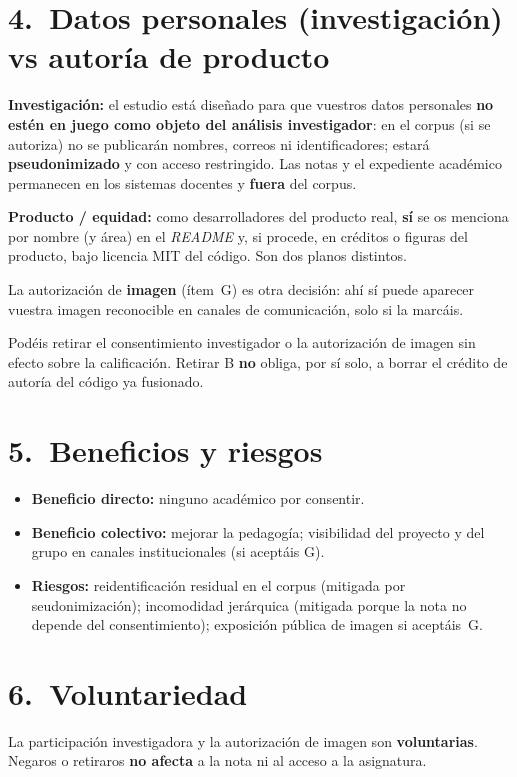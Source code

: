 \documentclass[11pt,a4paper]{scrartcl}
\begin{document}
\section*{4.\ Datos personales (investigación) vs autoría de producto}

\textbf{Investigación:} el estudio está diseñado para que vuestros datos personales
\textbf{no estén en juego como objeto del análisis investigador}: en el corpus
(si se autoriza) no se publicarán nombres, correos ni identificadores; estará
\textbf{pseudonimizado} y con acceso restringido. Las notas y el expediente
académico permanecen en los sistemas docentes y \textbf{fuera} del corpus.

\textbf{Producto / equidad:} como desarrolladores del producto real, \textbf{sí}
se os menciona por nombre (y área) en el \emph{README} y, si procede, en créditos o
figuras del producto, bajo licencia MIT del código. Son dos planos distintos.

La autorización de \textbf{imagen} (ítem~G) es otra decisión: ahí sí puede aparecer
vuestra imagen reconocible en canales de comunicación, solo si la marcáis.

Podéis retirar el consentimiento investigador o la autorización de imagen sin
efecto sobre la calificación. Retirar B \textbf{no} obliga, por sí solo, a borrar
el crédito de autoría del código ya fusionado.
\section*{5.\ Beneficios y riesgos}

\begin{itemize}
  \item \textbf{Beneficio directo:} ninguno académico por consentir.
  \item \textbf{Beneficio colectivo:} mejorar la pedagogía; visibilidad del
        proyecto y del grupo en canales institucionales (si aceptáis G).
  \item \textbf{Riesgos:} reidentificación residual en el corpus (mitigada por
        seudonimización); incomodidad jerárquica (mitigada porque la nota no
        depende del consentimiento); exposición pública de imagen si aceptáis~G.
\end{itemize}

\section*{6.\ Voluntariedad}

La participación investigadora y la autorización de imagen son
\textbf{voluntarias}. Negaros o retiraros \textbf{no afecta} a la nota
ni al acceso a la asignatura.
\end{document}
